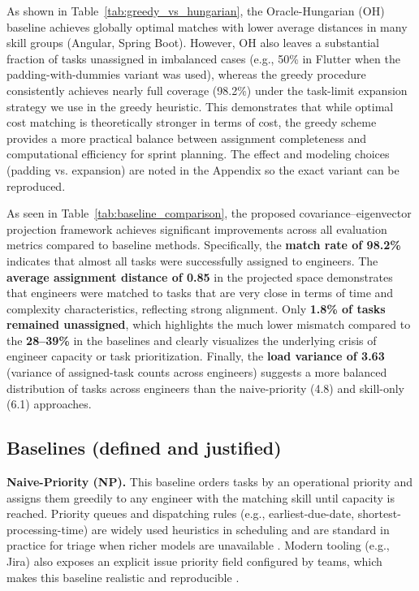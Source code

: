 \documentclass[final,1p,times]{elsarticle}
\begin{document}
As shown in Table~\ref{tab:greedy_vs_hungarian}, the Oracle-Hungarian (OH) baseline \cite{kuhn1955hungarian,munkres1957algorithms,BurkardAssignmentBook}
achieves globally optimal matches with lower average distances in many skill groups (Angular, Spring Boot). However, OH also leaves a substantial fraction of tasks unassigned in imbalanced cases (e.g., 50\% in Flutter when the padding-with-dummies variant was used), whereas the greedy procedure consistently achieves nearly full coverage (98.2\%) under the task-limit expansion strategy we use in the greedy heuristic. This demonstrates that while optimal cost matching is theoretically stronger in terms of cost, the greedy scheme provides a more practical balance between assignment completeness and computational efficiency for sprint planning. The effect and modeling choices (padding vs. expansion) are noted in the Appendix so the exact variant can be reproduced.

\vspace{6pt}
As seen in Table~\ref{tab:baseline_comparison}, the proposed covariance--eigenvector projection framework
achieves significant improvements across all evaluation metrics compared to baseline methods.
Specifically, the \textbf{match rate of 98.2\%} indicates that almost all tasks were successfully assigned to engineers.
The \textbf{average assignment distance of 0.85} in the projected space demonstrates that engineers were matched
to tasks that are very close in terms of time and complexity characteristics, reflecting strong alignment.
Only \textbf{1.8\% of tasks remained unassigned}, which highlights the much lower mismatch compared to the \textbf{28--39\%} in the baselines and clearly visualizes the underlying crisis of engineer capacity or task prioritization.
Finally, the \textbf{load variance of 3.63} (variance of assigned-task counts across engineers) suggests a more balanced distribution of tasks across engineers
than the naive-priority (4.8) and skill-only (6.1) approaches.

\subsection{Baselines (defined and justified)}
\label{sec:baselines}

\textbf{Naive-Priority (NP).} This baseline orders tasks by an operational priority and assigns them greedily to any engineer with the matching skill until capacity is reached. Priority queues and dispatching rules (e.g., earliest-due-date, shortest-processing-time) are widely used heuristics in scheduling and are standard in practice for triage when richer models are unavailable \cite{karger_sched_notes}. Modern tooling (e.g., Jira) also exposes an explicit issue priority field configured by teams, which makes this baseline realistic and reproducible \cite{atlassian_priorities}.
\vspace{2pt}
\end{document}
